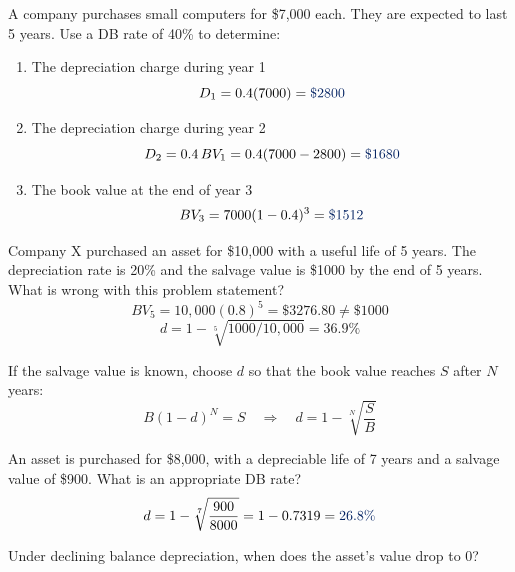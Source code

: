 \begin{example}
    A company purchases small computers for \$7,000 each. They are expected
    to last 5 years. Use a DB rate of 40\% to determine:
    \begin{enumerate}[label = \alph*)]
        \item The depreciation charge during year 1
        \[D_1 = 0.4(7000) = \db{\$2800}\]
        \item The depreciation charge during year 2
        \[D_2 = 0.4\,BV_1 = 0.4(7000 - 2800) = \db{\$1680}\]
        \item The book value at the end of year 3
        \[BV_3 = 7000(1 - 0.4)^3 = \db{\$1512}\]
    \end{enumerate}
\end{example}

\begin{example}
    Company X purchased an asset for \$10,000 with a useful life of 5 years.
    The depreciation rate is 20\% and the salvage value is \$1000 by the end
    of 5 years. What is wrong with this problem statement?
    \\
    \[BV_5 = 10{,}000(0.8)^5 = \$3276.80 \neq \$1000\]
    \[d = 1 - \sqrt[5]{1000/10{,}000} = 36.9\%\]
\end{example}

If the salvage value is known, choose $d$ so that the book value reaches $S$
after $N$ years:
\[B(1 - d)^N = S \quad\Longrightarrow\quad \boxed{d = 1 - \sqrt[N]{\frac{S}{B}}}\]

\begin{example}
    An asset is purchased for \$8,000, with a depreciable life of 7 years and
    a salvage value of \$900. What is an appropriate DB rate?
    \[d = 1 - \sqrt[7]{\frac{900}{8000}} = 1 - 0.7319 = \db{26.8\%}\]
\end{example}

\begin{example}
    Under declining balance depreciation, when does the asset's value drop
    to 0?
    \\
\end{example}


